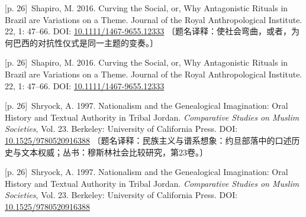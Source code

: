 \documentclass[10pt,a4paper]{article}
\begin{document}
\noindent\begin{minipage}{\textwidth}\begin{minipage}[t]{\dimexpr.5\textwidth-4mm\relax}\noindent\begin{minipage}[t]{\linewidth}{\scriptsize\color{gray} [p. 26]}\ Shapiro, M. 2016. Curving the Social, or, Why Antagonistic Rituals in Brazil are Variations on a Theme. Journal of the Royal Anthropological Institute. 22, 1: 47–66. DOI: \url{10.1111/1467-9655.12333} 〔题名译释：使社会弯曲，或者，为何巴西的对抗性仪式是同一主题的变奏。〕\par\end{minipage}\par\end{minipage}\hfill\begin{minipage}[t]{\dimexpr.5\textwidth-4mm\relax}\noindent\begin{minipage}[t]{\linewidth}{\scriptsize\color{gray} [p. 26]}\ Shapiro, M. 2016. Curving the Social, or, Why Antagonistic Rituals in Brazil are Variations on a Theme. Journal of the Royal Anthropological Institute. 22, 1: 47–66. DOI: \url{10.1111/1467-9655.12333}\par\end{minipage}\par\end{minipage}\end{minipage}\par
\noindent\begin{minipage}{\textwidth}\begin{minipage}[t]{\dimexpr.5\textwidth-4mm\relax}\noindent\begin{minipage}[t]{\linewidth}{\scriptsize\color{gray} [p. 26]}\ Shryock, A. 1997. Nationalism and the Genealogical Imagination: Oral History and Textual Authority in Tribal Jordan. \textit{Comparative Studies on Muslim Societies}, Vol. 23. Berkeley: University of California Press. DOI: \url{10.1525/9780520916388} 〔题名译释：民族主义与谱系想象：约旦部落中的口述历史与文本权威；丛书：穆斯林社会比较研究，第23卷。〕\par\end{minipage}\par\end{minipage}\hfill\begin{minipage}[t]{\dimexpr.5\textwidth-4mm\relax}\noindent\begin{minipage}[t]{\linewidth}{\scriptsize\color{gray} [p. 26]}\ Shryock, A. 1997. Nationalism and the Genealogical Imagination: Oral History and Textual Authority in Tribal Jordan. \textit{Comparative Studies on Muslim Societies}, Vol. 23. Berkeley: University of California Press. DOI: \url{10.1525/9780520916388}\par\end{minipage}\par\end{minipage}\end{minipage}\par
\end{document}
